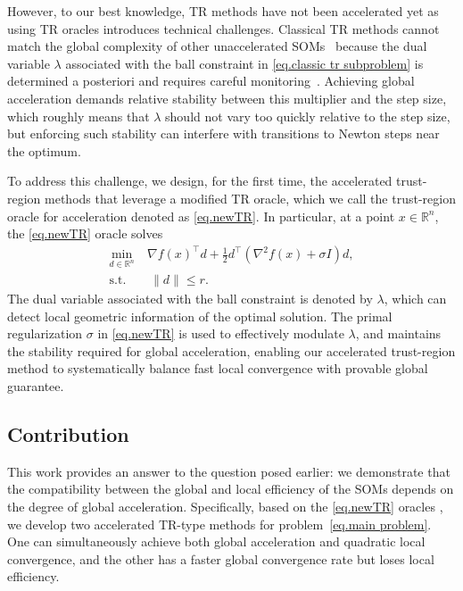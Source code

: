 However, to our best knowledge,  TR methods have not been accelerated yet as
using TR oracles introduces technical challenges. Classical TR methods cannot match the global complexity of other unaccelerated SOMs~\cite{cartisComplexitySteepestDescent2010,curtis2017trust} because the dual variable $\lambda$ associated with the ball constraint in \eqref{eq.classic tr subproblem} is determined a posteriori and requires careful monitoring~\cite{curtis2018concise}. Achieving global acceleration demands relative stability between this multiplier and the step size, which roughly means that $\lambda$ should not vary too quickly relative to the step size, but enforcing such stability can interfere with transitions to Newton steps near the optimum.

To address this challenge, we design, for the first time, the accelerated trust-region methods that leverage a modified TR oracle, which we call the trust-region oracle for acceleration denoted as \ref{eq.newTR}. In particular, at a point $x \in \mathbb{R}^n$, the \ref{eq.newTR} oracle solves
\begin{equation*}
\begin{aligned}
\min_{d \in \mathbb{R}^n}~ & \nabla f(x)^\top d 
    + \tfrac{1}{2} d^\top (\nabla^2 f(x) + \sigma I) d, \\
\text{s.t.} &~ \|d\| \le r.
\end{aligned}
\tag*{(TR$_+$)}
\end{equation*}
The dual variable associated with the ball constraint is denoted by $\lambda$, which can detect local geometric information of the optimal solution. 
The primal regularization $\sigma$ in \ref{eq.newTR} is used to effectively modulate $\lambda$, and maintains the stability required for global acceleration, enabling our accelerated trust-region method to systematically balance fast local convergence with provable global guarantee.
\subsection{Contribution}
This work provides an answer to the question posed earlier: we demonstrate that the compatibility between the global and local efficiency of the SOMs depends on the degree of global acceleration.
Specifically, based on the \ref{eq.newTR} oracles \cite{jiang2024nonconvexityuniversaltrustregionmethod}, we develop two accelerated TR-type methods for problem~\eqref{eq.main problem}. One can simultaneously achieve both global acceleration and quadratic local convergence, and the other has a faster global convergence rate but loses local efficiency.

